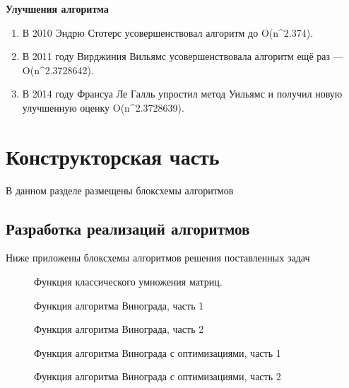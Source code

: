 \documentclass[a4paper, 14pt]{article}
\begin{document}
\normalsize \textbf {Улучшения алгоритма} \\

\begin{enumerate}
\item В 2010 Эндрю Стотерс усовершенствовал алгоритм до {\displaystyle O(n^{2.374}).}


\item В 2011 году Вирджиния Вильямс усовершенствовала алгоритм ещё раз — {\displaystyle O(n^{2.3728642}).}

\item В 2014 году Франсуа Ле Галль упростил метод Уильямс и получил новую улучшенную оценку {\displaystyle O(n^{2.3728639}).}

\end{enumerate}
	
		\newpage
	\section{Конструкторская часть}
	В данном разделе размещены блоксхемы алгоритмов
	\subsection{Разработка реализаций алгоритмов}
	
	Ниже приложены блоксхемы алгоритмов решения поставленных задач


\begin{figure}[ht!]
\caption{Функция классического умножения матриц.}
\label{ris:lev}
\end{figure}

\begin{figure}[pt!]
\caption{Функция алгоритма Винограда, часть 1}
\label{ris:dam_lev}
\end{figure}

\begin{figure}[pt!]
\caption{Функция алгоритма Винограда, часть 2}
\label{ris:dam_lev}
\end{figure}

\begin{figure}[pt!]
\caption{Функция алгоритма Винограда с оптимизациями, часть 1}
\label{ris:dam_lev}
\end{figure}

\begin{figure}[pt!]
\caption{Функция алгоритма Винограда с оптимизациями, часть 2}
\label{ris:dam_lev}
\end{figure}
	
\end{document}
